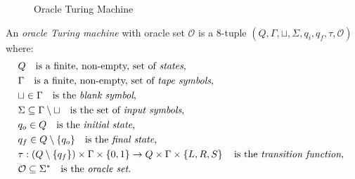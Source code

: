\begin{figure}[t]
\centering
{}
\caption{\label{fig:Oracle-Turing-Machine}Oracle Turing Machine}
\end{figure}

\begin{definition}
\label{def:Oracle-Turing-Machine}
An \emph{oracle Turing machine} with oracle set $\mathcal{O}$ is a 8-tuple $\left(Q, \Gamma, \sqcup, \Sigma, q_i, q_f, \tau, \mathcal{O} \right)$ where:
\begin{align*}
 & Q \quad \text{is a finite, non-empty, set of \emph{states},} \index{Machine State} \\
 & \Gamma \quad \text{is a finite, non-empty, set of \emph{tape symbols},} \index{Tape Symbol} \\
 & \sqcup\in\Gamma \quad \text{is the \emph{blank symbol},} \index{Blank Symbol} \\
 & \Sigma\subseteq\Gamma\setminus\sqcup \quad \text{is the set of \emph{input symbols},}  \index{Input Symbol} \\
 & q_{o}\in Q \quad \text{is the \emph{initial state},} \index{Initial State} \\
 & q_{f}\in Q \setminus \{q_o\} \quad \text{is the \emph{final state},} \index{Final State} \\ 
 & \tau: \left(Q \setminus \{q_{f}\}\right) \times \Gamma \times \{0, 1\} \rightarrow  Q\times\Gamma\times\left\{ L,R,S\right\} \quad\text{is the \emph{transition function}, \index{Transition Function} } \\
 & \mathcal{O} \subseteq \Sigma^\ast \quad \text{is the \emph{oracle set}.}
\end{align*}
\end{definition}

